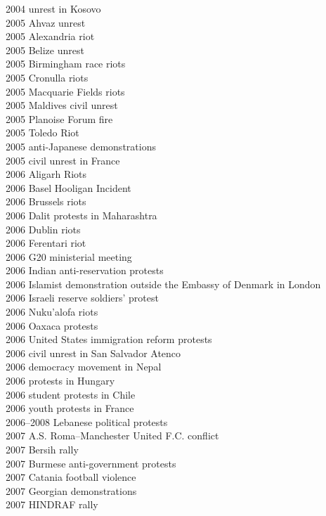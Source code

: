 2004 unrest in Kosovo\\
2005 Ahvaz unrest\\
2005 Alexandria riot\\
2005 Belize unrest\\
2005 Birmingham race riots\\
2005 Cronulla riots\\
2005 Macquarie Fields riots\\
2005 Maldives civil unrest\\
2005 Planoise Forum fire\\
2005 Toledo Riot\\
2005 anti-Japanese demonstrations\\
2005 civil unrest in France\\
2006 Aligarh Riots\\
2006 Basel Hooligan Incident\\
2006 Brussels riots\\
2006 Dalit protests in Maharashtra\\
2006 Dublin riots\\
2006 Ferentari riot\\
2006 G20 ministerial meeting\\
2006 Indian anti-reservation protests\\
2006 Islamist demonstration outside the Embassy of Denmark in London\\
2006 Israeli reserve soldiers' protest\\
2006 Nuku'alofa riots\\
2006 Oaxaca protests\\
2006 United States immigration reform protests\\
2006 civil unrest in San Salvador Atenco\\
2006 democracy movement in Nepal\\
2006 protests in Hungary\\
2006 student protests in Chile\\
2006 youth protests in France\\
2006–2008 Lebanese political protests\\
2007 A.S. Roma–Manchester United F.C. conflict\\
2007 Bersih rally\\
2007 Burmese anti-government protests\\
2007 Catania football violence\\
2007 Georgian demonstrations\\
2007 HINDRAF rally\\
